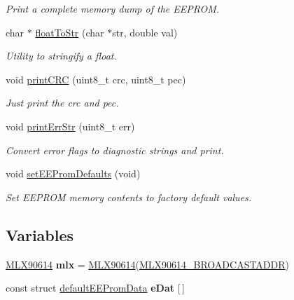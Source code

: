 \begin{DoxyCompactItemize}
\begin{DoxyCompactList}\small\item\em Print a complete memory dump of the E\-E\-P\-R\-O\-M. \end{DoxyCompactList}\item 
char $\ast$ \hyperlink{_melexis_test_8ino_abbd67db9a56c14f56c98c750daf1ab92}{float\-To\-Str} (char $\ast$str, double val)
\begin{DoxyCompactList}\small\item\em Utility to stringify a float. \end{DoxyCompactList}\item 
void \hyperlink{_melexis_test_8ino_a9ca1a07ce803c9b09a05b991f0101107}{print\-C\-R\-C} (uint8\-\_\-t crc, uint8\-\_\-t pec)
\begin{DoxyCompactList}\small\item\em Just print the crc and pec. \end{DoxyCompactList}\item 
void \hyperlink{_melexis_test_8ino_a47075beca8233f9f8e9614f4fb6eabd1}{print\-Err\-Str} (uint8\-\_\-t err)
\begin{DoxyCompactList}\small\item\em Convert error flags to diagnostic strings and print. \end{DoxyCompactList}\item 
void \hyperlink{_melexis_test_8ino_a5662aecfa23cb7ad365b8246e928c843}{set\-E\-E\-Prom\-Defaults} (void)
\begin{DoxyCompactList}\small\item\em Set E\-E\-P\-R\-O\-M memory contents to factory default values. \end{DoxyCompactList}\end{DoxyCompactItemize}
\subsection*{Variables}
\begin{DoxyCompactItemize}
\item 
\hypertarget{_melexis_test_8ino_af12b22cf7e5666147279557c9b55db66}{\hyperlink{class_m_l_x90614}{M\-L\-X90614} {\bfseries mlx} = \hyperlink{class_m_l_x90614}{M\-L\-X90614}(\hyperlink{_m_l_x90614_8h_afc35f075f26585b4d971069e63c21c12}{M\-L\-X90614\-\_\-\-B\-R\-O\-A\-D\-C\-A\-S\-T\-A\-D\-D\-R})}\label{_melexis_test_8ino_af12b22cf7e5666147279557c9b55db66}

\item 
const struct \hyperlink{structdefault_e_e_prom_data}{default\-E\-E\-Prom\-Data} {\bfseries e\-Dat} \mbox{[}$\,$\mbox{]}
\end{DoxyCompactItemize}


